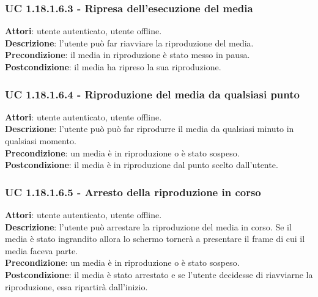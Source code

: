 	\subsubsection{UC 1.18.1.6.3 - Ripresa dell'esecuzione del media}{
		\label{uc1.18.1.6.3}
		\textbf{Attori}: utente autenticato, utente offline. \\
		\textbf{Descrizione}: l'utente può far riavviare la riproduzione del media. \\
		\textbf{Precondizione}: il media in riproduzione è stato messo in pausa.	\\
		\textbf{Postcondizione}: il media ha ripreso la sua riproduzione.
	}
	\subsubsection{UC 1.18.1.6.4 - Riproduzione del media da qualsiasi punto}{
		\label{uc1.18.1.6.4}
		\textbf{Attori}: utente autenticato, utente offline. \\
		\textbf{Descrizione}: l'utente può può far riprodurre il media da qualsiasi minuto in qualsiasi momento. \\
		\textbf{Precondizione}: un media è in riproduzione o è stato sospeso.	\\
		\textbf{Postcondizione}: il media è in riproduzione dal punto scelto dall'utente.
	}
	\subsubsection{UC 1.18.1.6.5 - Arresto della riproduzione in corso}{
		\label{uc1.18.1.6.5}
		\textbf{Attori}: utente autenticato, utente offline. \\
		\textbf{Descrizione}: l'utente può arrestare la riproduzione del media in corso. Se il media è stato ingrandito allora lo schermo tornerà a presentare il frame di cui il media faceva parte. \\
		\textbf{Precondizione}: un media è in riproduzione o è stato sospeso.	\\
		\textbf{Postcondizione}: il media è stato arrestato e se l'utente decidesse di riavviarne la riproduzione, essa ripartirà dall'inizio.
	}
